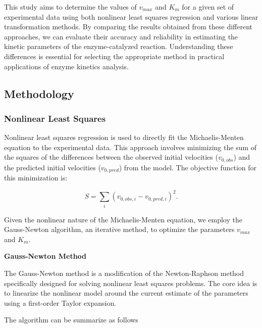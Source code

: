 \documentclass{article} %
\theoremstyle{definition}
\theoremstyle{remark}
\theoremstyle{plain}
\begin{document}
This study aims to determine the values of \(v_{max}\) and \(K_m\) for a given set of experimental data using both nonlinear least squares regression and various linear transformation methods. By comparing the results obtained from these different approaches, we can evaluate their accuracy and reliability in estimating the kinetic parameters of the enzyme-catalyzed reaction. Understanding these differences is essential for selecting the appropriate method in practical applications of enzyme kinetics analysis.



\subsection{Methodology}

\subsubsection{Nonlinear Least Squares}
Nonlinear least squares regression is used to directly fit the Michaelis-Menten equation to the experimental data. This approach involves minimizing the sum of the squares of the differences between the observed initial velocities (\(v_{0,obs}\)) and the predicted initial velocities (\(v_{0,pred}\)) from the model. The objective function for this minimization is:

\[
S = \sum_{i} (v_{0,obs,i} - v_{0,pred,i})^2.
\]

Given the nonlinear nature of the Michaelis-Menten equation, we employ the Gauss-Newton algorithm, an iterative method, to optimize the parameters \(v_{max}\) and \(K_m\). 

\textbf{Gauss-Newton Method}

The Gauss-Newton method is a modification of the Newton-Raphson method specifically designed for solving nonlinear least squares problems. The core idea is to linearize the nonlinear model around the current estimate of the parameters using a first-order Taylor expansion.

The algorithm can be summarize as follows
\end{document}
